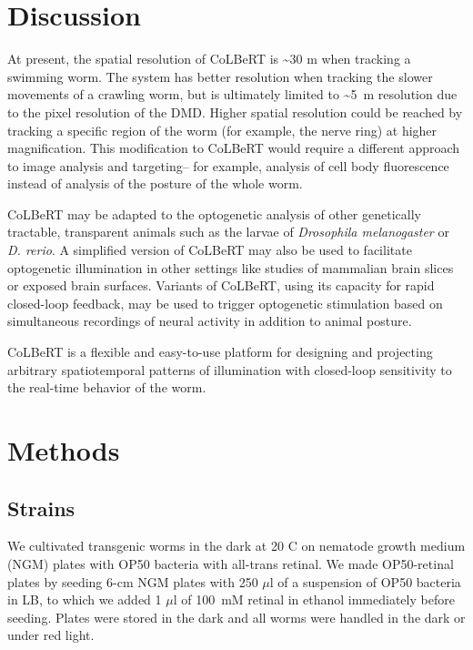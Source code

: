 \section{Discussion}
At present, the spatial resolution of CoLBeRT is \textasciitilde{30} \textmu m when tracking a swimming worm. The system has better resolution when tracking the slower movements of a crawling worm, but is ultimately limited to \textasciitilde5~\textmu m resolution due to the pixel resolution of the DMD. Higher spatial resolution could be reached by tracking a specific region of the worm (for example, the nerve ring) at higher magnification. This modification to CoLBeRT would require a different approach to image analysis and targeting-- for example, analysis of cell body fluorescence instead of analysis of the posture of the whole worm.

CoLBeRT may be adapted to the opto\-gen\-etic analysis of other genetic\-ally tract\-able, trans\-parent animals such as the larvae of  \textit{Drosophila melanogaster} or \textit{D. rerio}. A simplified version of CoLBeRT may also be used to facilitate optogenetic illumination in other settings like studies of mammalian brain slices or exposed brain surfaces. Variants of CoLBeRT, using its capacity for rapid closed-loop feedback, may be used to trigger optogenetic stimulation based on simultaneous recordings of neural activity in addition to animal posture.

CoLBeRT is a flexible and easy-to-use platform for designing and projecting arbitrary spatiotemporal patterns of illumination with closed-loop sensitivity to the real-time behavior of the worm.

\section{Methods}
\subsection{Strains}
We cultivated transgenic worms in the dark at 20 \textdegree C on nematode growth medium (NGM) plates with OP50 bacteria with all-trans retinal. We made OP50-retinal plates by seeding 6-cm NGM plates with 250 $\mu$l of a suspension of OP50 bacteria in LB, to which we added 1 $\mu$l of 100~mM retinal in ethanol immediately before seeding. Plates were stored in the dark and all worms were handled in the dark or under red light.


